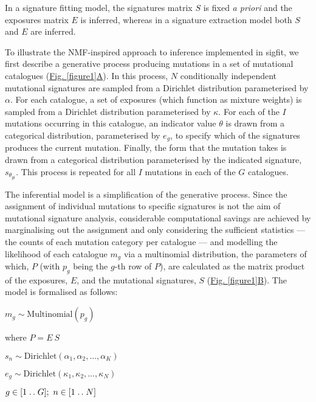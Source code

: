 In a signature fitting model, the signatures matrix $S$ is fixed \textit{a priori} and the exposures matrix $E$ is inferred, whereas in a signature extraction model both $S$ and $E$ are inferred.

To illustrate the NMF-inspired approach to inference implemented in sigfit, we first describe a generative process producing mutations in a set of mutational catalogues (\hyperref[figure1]{Fig. \ref*{figure1}A}). In this process, $N$ conditionally independent mutational signatures are sampled from a Dirichlet distribution parameterised by $\alpha$. For each catalogue, a set of exposures (which function as mixture weights) is sampled from a Dirichlet distribution parameterised by $\kappa$. For each of the $I$ mutations occurring in this catalogue, an indicator value $\theta$ is drawn from a categorical distribution, parameterised by $e_g$, to specify which of the signatures produces the current mutation. Finally, the form that the mutation takes is drawn from a categorical distribution parameterised by the indicated signature, $s_{\theta_{gi}}$. This process is repeated for all $I$ mutations in each of the $G$ catalogues.

The inferential model is a simplification of the generative process. Since the assignment of individual mutations to specific signatures is not the aim of mutational signature analysis, considerable computational savings are achieved by marginalising out the assignment and only considering the sufficient statistics --- the counts of each mutation category per catalogue --- and modelling the likelihood of each catalogue $m_g$ via a multinomial distribution, the parameters of which, $P$ (with $p_g$ being the $g$-th row of $P$), are calculated as the matrix product of the exposures, $E$, and the mutational signatures, $S$ (\hyperref[figure1]{Fig. \ref*{figure1}B}). The model is formalised as follows:

\begin{center}
\onehalfspacing

$m_g \sim \text{Multinomial}(p_g)$

where $P = E\ S$

$s_n \sim \text{Dirichlet}(\alpha_1, \alpha_2, \dots, \alpha_K) $

$e_g \sim \text{Dirichlet}(\kappa_1, \kappa_2, \dots, \kappa_N)$

$g \in [1 \mathrel{{.}\,{.}}\nobreak G];\ n \in [1 \mathrel{{.}\,{.}}\nobreak N]$
\end{center}

